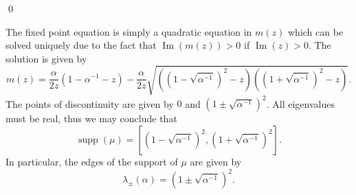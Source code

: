 \documentclass{article}
\begin{document}
\qed
\bigskip
\par
The fixed point equation is simply a quadratic equation in $m(z)$ which can be solved uniquely due to the fact that $\operatorname{Im}(m(z))>0$ if $\operatorname{Im}(z)>0$. The solution is given by
\begin{equation}
m(z)=\frac{\alpha}{2z}(1-\alpha^{-1}-z)-\frac{\alpha}{2z}\sqrt{((1-\sqrt{\alpha^{-1}})^2-z)((1+\sqrt{\alpha^{-1}})^2-z)}.
\end{equation}
The points of discontinuity are given by $0$ and $(1\pm\sqrt{\alpha^{-1}})^2$. All eigenvalues must be real, thus we may conclude that
\begin{equation}
\operatorname{supp}(\mu)=\left[(1-\sqrt{\alpha^{-1}})^2,(1+\sqrt{\alpha^{-1}})^2\right].
\end{equation}
In particular, the edges of the support of $\mu$ are given by
\begin{equation}
\lambda_\pm(\alpha)=(1\pm\sqrt{\alpha^{-1}})^2.
\end{equation}
\bigskip
\end{document}
